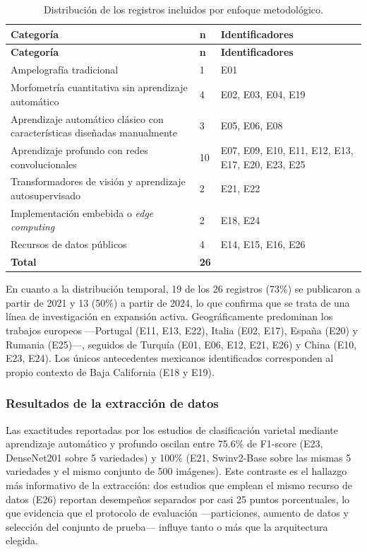 \begin{longtable}{L{4.6cm}L{1.0cm}L{7.5cm}}
\caption{Distribución de los registros incluidos por enfoque metodológico.}
\label{tab:caracteristicas} \\
\toprule
\textbf{Categoría} & \textbf{n} & \textbf{Identificadores} \\
\midrule
\endfirsthead
\toprule
\textbf{Categoría} & \textbf{n} & \textbf{Identificadores} \\
\midrule
\endhead
Ampelografía tradicional & 1 & E01 \\
Morfometría cuantitativa sin aprendizaje automático & 4 & E02, E03, E04, E19 \\
Aprendizaje automático clásico con características diseñadas manualmente & 3 & E05, E06, E08 \\
Aprendizaje profundo con redes convolucionales & 10 & E07, E09, E10, E11, E12, E13, E17, E20, E23, E25 \\
Transformadores de visión y aprendizaje autosupervisado & 2 & E21, E22 \\
Implementación embebida o \textit{edge computing} & 2 & E18, E24 \\
Recursos de datos públicos & 4 & E14, E15, E16, E26 \\
\midrule
\textbf{Total} & \textbf{26} & \\
\bottomrule
\end{longtable}

En cuanto a la distribución temporal, 19 de los 26 registros (73\%) se
publicaron a partir de 2021 y 13 (50\%) a partir de 2024, lo que confirma que
se trata de una línea de investigación en expansión activa. Geográficamente
predominan los trabajos europeos —Portugal (E11, E13, E22), Italia (E02,
E17), España (E20) y Rumania (E25)—, seguidos de Turquía (E01, E06, E12, E21,
E26) y China (E10, E23, E24). Los únicos antecedentes mexicanos identificados
corresponden al propio contexto de Baja California (E18 y E19).

\subsubsection{Resultados de la extracción de datos}

Las exactitudes reportadas por los estudios de clasificación varietal mediante
aprendizaje automático y profundo oscilan entre 75.6\% de F1-score (E23,
DenseNet201 sobre 5 variedades) y 100\% (E21, Swinv2-Base sobre las mismas 5
variedades y el mismo conjunto de 500 imágenes). Este contraste es el hallazgo
más informativo de la extracción: dos estudios que emplean el mismo recurso de
datos (E26) reportan desempeños separados por casi 25 puntos porcentuales, lo
que evidencia que el protocolo de evaluación —particiones, aumento de datos y
selección del conjunto de prueba— influye tanto o más que la arquitectura
elegida.

